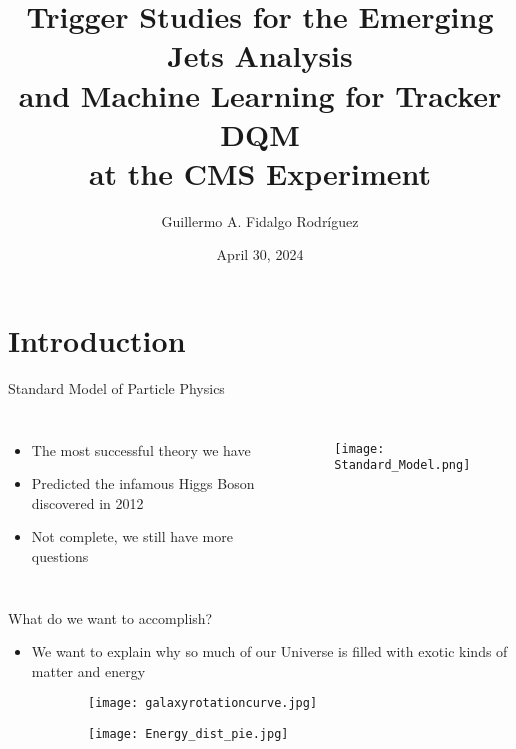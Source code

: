 \documentclass[aspectratio=1610]{beamer}
\title[EMJ and ML4TkDQM]{Trigger Studies for the Emerging Jets Analysis \\and Machine Learning for Tracker DQM \\at the CMS Experiment}
\author[GAFR]{Guillermo A. Fidalgo Rodríguez}
\institute[UPRM]{University of Puerto Rico -- Mayagüez}
\date{April 30, 2024}
\begin{document}
\maketitle

\begin{frame}
	\tableofcontents
\end{frame}

\section{Introduction}

\begin{frame}{Standard Model of Particle Physics}
	\begin{columns}

		\begin{itemize}
			\item The most successful theory we have
			      \vspace*{1cm}
			\item Predicted the infamous Higgs Boson discovered in 2012
			      \vspace{1cm}
			\item Not complete, we still have more questions
		\end{itemize}
		\begin{figure}
			\texttt{[image: Standard\_Model.png]}
		\end{figure}
	\end{columns}
\end{frame}

\begin{frame}{What do we want to accomplish?}
	\begin{itemize}
		\item We want to explain why so much of our Universe is filled with exotic kinds of matter and energy
	\end{itemize}
	\begin{figure}
		\centering
		\begin{subfigure}{0.45\linewidth}
			\texttt{[image: galaxyrotationcurve.jpg]}
		\end{subfigure}
		\begin{subfigure}{0.45\linewidth}
			\texttt{[image: Energy\_dist\_pie.jpg]}
		\end{subfigure}
	\end{figure}
\end{frame}
\end{document}
